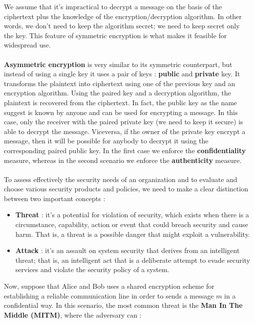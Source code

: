 \documentclass[11pt]{article}
\begin{document}
We assume that it's impractical to decrypt a message on the basis of the ciphertext plus the knowledge of the encryption/decryption algorithm. In other words, we don't need to keep the algorithm secret; we need to keep secret only the key. This feature of symmetric encryption is what makes it feasible for widespread use.\\\\\textbf{Asymmetric encryption} is very similar to its symmetric counterpart, but instead of using a single key it uses a pair of keys : \textbf{public} and \textbf{private} key. It transforms the plaintext into ciphertext using one of the previous key and an encryption algorithm. Using the paired key and a decryption algorithm, the plaintext is recovered from the ciphertext. In fact, the public key as the name suggest is known by anyone and can be used for encrypting a message. In this case, only the receiver with the paired private key (we need to keep it secure) is able to decrypt the message. Viceversa, if the owner of the private key encrypt a message, then it will be possible for anybody to decrypt it using the corresponding paired public key. In the first case we enforce the \textbf{confidentiality} measure, whereas in the second scenario we enforce the \textbf{authenticity} measure.\\\\To assess effectively the security needs of an organization and to evaluate and choose various security products and policies, we need to make a clear distinction between two important concepts :
\begin{itemize}
\item \textbf{Threat} : it's a potential for violation of security, which exists when there is a circumstance, capability, action or event that could breach security and cause harm. That is, a threat is a possible danger that might exploit a vulnerability.
\item \textbf{Attack} : it's an assault on system security that derives from an intelligent threat; that is, an intelligent act that is a deliberate attempt to evade security services and violate the security policy of a system.
\end{itemize}
Now, suppose that Alice and Bob uses a shared encryption scheme for establishing a reliable communication line in order to sends a message $m$ in a confidential way. In this scenario, the most common threat is the \textbf{Man In The Middle (MITM)}, where the adversary can : 
\end{document}

